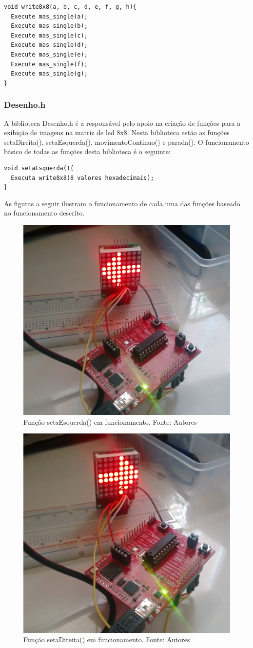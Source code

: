 \documentclass[conference]{IEEEtran}
\begin{document}
\begin{lstlisting}
void write8x8(a, b, c, d, e, f, g, h){
  Execute mas_single(a);
  Execute mas_single(b);
  Execute mas_single(c);
  Execute mas_single(d);
  Execute mas_single(e);
  Execute mas_single(f);
  Execute mas_single(g);
}
\end{lstlisting}

\subsubsection{Desenho.h}
A biblioteca Desenho.h é a responsável pelo apoio na criação de funções para a exibição de imagens na matriz de led 8x8. Nesta biblioteca estão as funções setaDireita(), setaEsquerda(), movimentoContinuo() e parada(). O funcionamento básico de todas as funções desta biblioteca é o seguinte:

\begin{lstlisting}
void setaEsquerda(){
  Executa write8x8(8 valores hexadecimais);
}
\end{lstlisting}

As figuras a seguir ilustram o funcionamento de cada uma das funções baseado no funcionamento descrito.

\begin{figure}[H]
  \centering
  \includegraphics[width=0.5\linewidth]{esq}
  \caption{Função setaEsquerda() em funcionamento. Fonte: Autores}
  \label{fig:esq}
\end{figure}

\begin{figure}[H]
  \centering
  \includegraphics[width=0.5\linewidth]{dir}
  \caption{Função setaDireita() em funcionamento. Fonte: Autores}
  \label{fig:dir}
\end{figure}
\end{document}
